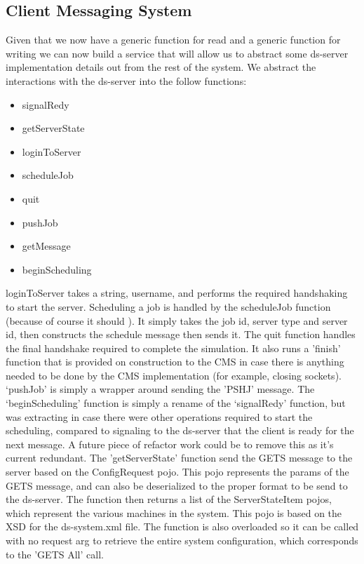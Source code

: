 \documentclass[a4paper]{article} %
\begin{document}
\subsection*{Client Messaging System}
Given that we now have a generic function for read and a generic function for writing we can now build a service that will allow us to abstract some ds-server implementation details out from the rest of the system.
We abstract the interactions with the ds-server into the follow functions:
\begin{itemize}
    \item signalRedy
    \item getServerState
    \item loginToServer
    \item scheduleJob
    \item quit
    \item pushJob
    \item getMessage
    \item beginScheduling
\end{itemize}
loginToServer takes a string, username, and performs the required handshaking to start the server.
Scheduling a job is handled by the scheduleJob function (because of course it should \cite{loureiro_2015}). It simply takes the job id, server type and server id, then constructs the schedule message then sends it.
The quit function handles the final handshake required to complete the simulation. It also runs a 'finish' function that is provided on construction to the CMS in case there is anything needed to be done by the CMS implementation (for example, closing sockets).
`pushJob' is simply a wrapper around sending the 'PSHJ' message. The `beginScheduling' function is simply a rename of the `signalRedy' function, but was extracting in case there were other operations required to start the scheduling, compared to signaling to the ds-server that the client is ready for the next message. A future piece of refactor work could be to remove this as it's current redundant. 
\newline
The 'getServerState' function send the GETS message to the server based on the ConfigRequest pojo.
This pojo represents the params of the GETS message, and can also be deserialized to the proper format to be send to the ds-server.
The function then returns a list of the ServerStateItem pojos, which represent the various machines in the system. This pojo is based on the XSD for the ds-system.xml file.
The function is also overloaded so it can be called with no request arg to retrieve the entire system configuration, which corresponds to the 'GETS All' call.
\end{document}
